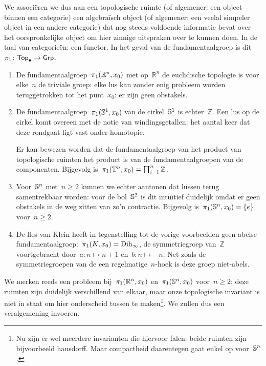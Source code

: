 \documentclass[a4paper,11pt,openany,oneside,article]{memoir}
\begin{document}
We associ\"eren we dus aan een topologische ruimte (of algemener: een object binnen een categorie) een algebra\"isch object (of algemener: een veelal simpeler object in een andere categorie) dat nog steeds voldoende informatie bevat over het oorspronkelijke object om hier zinnige uitspraken over te kunnen doen. In de taal van categorie\"en: een functor. In het geval van de fundamentaalgroep is dit~$\pi_1\colon\mathsf{Top}_{\bullet}\to\mathsf{Grp}$.

\begin{example}
  \begin{enumerate}
    \item De fundamentaalgroep~$\pi_1(\mathbb{R}^n,x_0)$ met op~$\mathbb{R}^n$ de euclidische topologie is voor elke~$n$ de triviale groep: elke lus kan zonder enig probleem worden teruggetrokken tot het punt~$x_0$: er zijn geen obstakels.

    \item De fundamentaalgroep~$\pi_1(\mathbb{S}^1,x_0)$ van de cirkel~$\mathbb{S}^1$ is echter~$\mathbb{Z}$. Een lus op de cirkel komt overeen met de notie van windingsgetallen: het aantal keer dat deze rondgaat ligt vast onder homotopie.

      Er kan bewezen worden dat de fundamentaalgroep van het product van topologische ruimten het product is van de fundamentaalgroepen van de componenten. Bijgevolg is~$\pi_1(\mathbb{T}^n,x_0)=\prod_{i=1}^n\mathbb{Z}$.

    \item Voor~$\mathbb{S}^n$ met~$n\geq 2$ kunnen we echter aantonen dat lussen terug samentrekbaar worden: voor de bol~$\mathbb{S}^2$ is dit intu\"itief duidelijk omdat er geen obstakels in de weg zitten van zo'n contractie. Bijgevolg is~$\pi_1(\mathbb{S}^n,x_0)=\left\{ e \right\}$ voor~$n\geq 2$.

    \item De fles van Klein heeft in tegenstelling tot de vorige voorbeelden geen abelse fundamentaalgroep:~$\pi_1(K,x_0)=\mathrm{Dih}_{\infty}$, de symmetriegroep van~$\mathbb{Z}$ voortgebracht door~$a\colon n\mapsto n+1$ en~$b\colon n\mapsto -n$. Net zoals de symmetriegroepen van de een regelmatige~$n$\nobreakdash-hoek is deze groep niet-abels. 
  \end{enumerate}
\end{example}

We merken reeds een probleem bij~$\pi_1(\mathbb{R}^n,x_0)$ en~$\pi_1(\mathbb{S}^n,x_0)$ voor~$n\geq 2$: deze ruimten zijn duidelijk verschillend van elkaar, maar onze topologische invariant is niet in staat om hier onderscheid tussen te maken\footnote{Nu zijn er wel meerdere invarianten die hiervoor falen: beide ruimten zijn bijvoorbeeld hausdorff. Maar compactheid daarentegen gaat enkel op voor~$\mathbb{S}^n$.}. We zullen dus een veralgemening invoeren.
\end{document}

